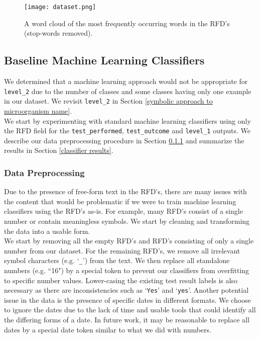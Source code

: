\documentclass[11pt]{article}
\begin{document}
\begin{figure}
    \centering
    \texttt{[image: dataset.png]} \\
    \caption{A word cloud of the most frequently occurring words in the RFD's (stop-words removed).}
    \label{most frequent words figure}
\end{figure}


\subsection{Baseline Machine Learning Classifiers} \label{baseline machine learning classifiers}

We determined that a machine learning approach would not be appropriate for \verb|level_2| due to the number of classes and some classes having only one example in our dataset. We revisit \verb|level_2| in Section \ref{symbolic approach to microorganism name}.
\\

We start by experimenting with standard machine learning classifiers using only the RFD field for the \verb|test_performed|, \verb|test_outcome| and \verb|level_1| outputs. We describe our data preprocessing procedure in Section \ref{data preprocessing} and summarize the results in Section \ref{classifier results}.


\subsubsection{Data Preprocessing} \label{data preprocessing}

Due to the presence of free-form text in the RFD's, there are many issues with the content that would be problematic if we were to train machine learning classifiers using the RFD's as-is. For example, many RFD's consist of a single number or contain meaningless symbols. We start by cleaning and transforming the data into a usable form.
\\

We start by removing all the empty RFD's and RFD's consisting of only a single number from our dataset. For the remaining RFD's, we remove all irrelevant symbol characters (e.g. `\verb|_|') from the text. We then replace all standalone numbers (e.g. ``16") by a special token to prevent our classifiers from overfitting to specific number values. Lower-casing the existing test result labels is also necessary as there are inconsistencies such as `\verb|Yes|' and `\verb|yes|'. Another potential issue in the data is the presence of specific dates in different formats. We choose to ignore the dates due to the lack of time and usable tools that could identify all the differing forms of a date. In future work, it may be reasonable to replace all dates by a special date token similar to what we did with numbers.
\\
\end{document}
